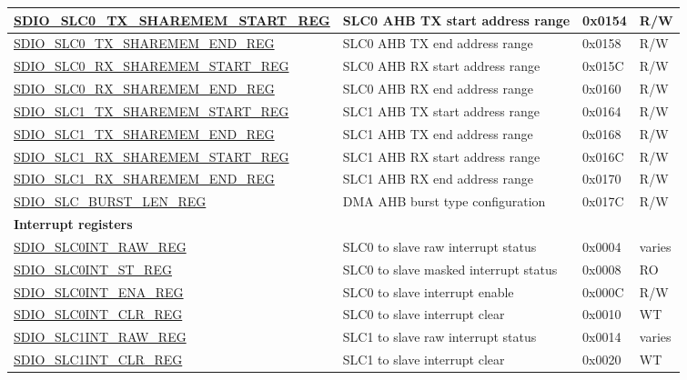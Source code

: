 \begin{longtable}{ | p{7.1cm} | p{6.1cm} | p{1.2cm} | p{1cm} | }
\hyperref[regdesc:SDIOSLC0TXSHAREMEMSTARTREG]{SDIO\_SLC0\_TX\_SHAREMEM\_START\_REG} & SLC0 AHB TX start address range & 0x0154 & R/W \\ \hline
\hyperref[regdesc:SDIOSLC0TXSHAREMEMENDREG]{SDIO\_SLC0\_TX\_SHAREMEM\_END\_REG} & SLC0 AHB TX end address range & 0x0158 & R/W \\ \hline
\hyperref[regdesc:SDIOSLC0RXSHAREMEMSTARTREG]{SDIO\_SLC0\_RX\_SHAREMEM\_START\_REG} & SLC0 AHB RX start address range & 0x015C & R/W \\ \hline
\hyperref[regdesc:SDIOSLC0RXSHAREMEMENDREG]{SDIO\_SLC0\_RX\_SHAREMEM\_END\_REG} & SLC0 AHB RX end address range & 0x0160 & R/W \\ \hline
\hyperref[regdesc:SDIOSLC1TXSHAREMEMSTARTREG]{SDIO\_SLC1\_TX\_SHAREMEM\_START\_REG} & SLC1 AHB TX start address range & 0x0164 & R/W \\ \hline
\hyperref[regdesc:SDIOSLC1TXSHAREMEMENDREG]{SDIO\_SLC1\_TX\_SHAREMEM\_END\_REG} & SLC1 AHB TX end address range & 0x0168 & R/W \\ \hline
\hyperref[regdesc:SDIOSLC1RXSHAREMEMSTARTREG]{SDIO\_SLC1\_RX\_SHAREMEM\_START\_REG} & SLC1 AHB RX start address range & 0x016C & R/W \\ \hline
\hyperref[regdesc:SDIOSLC1RXSHAREMEMENDREG]{SDIO\_SLC1\_RX\_SHAREMEM\_END\_REG} & SLC1 AHB RX end address range & 0x0170 & R/W \\ \hline
\hyperref[regdesc:SDIOSLCBURSTLENREG]{SDIO\_SLC\_BURST\_LEN\_REG} & DMA AHB burst type configuration & 0x017C & R/W \\ \hline
\multicolumn{4}{|l|}{\textbf{Interrupt registers}} \\ \hline
\hyperref[regdesc:SDIOSLC0INTRAWREG]{SDIO\_SLC0INT\_RAW\_REG} & SLC0 to slave raw interrupt status & 0x0004 & varies \\ \hline
\hyperref[regdesc:SDIOSLC0INTSTREG]{SDIO\_SLC0INT\_ST\_REG} & SLC0 to slave masked interrupt status & 0x0008 & RO \\ \hline
\hyperref[regdesc:SDIOSLC0INTENAREG]{SDIO\_SLC0INT\_ENA\_REG} & SLC0 to slave interrupt enable & 0x000C & R/W \\ \hline
\hyperref[regdesc:SDIOSLC0INTCLRREG]{SDIO\_SLC0INT\_CLR\_REG} & SLC0 to slave interrupt clear & 0x0010 & WT \\ \hline
\hyperref[regdesc:SDIOSLC1INTRAWREG]{SDIO\_SLC1INT\_RAW\_REG} & SLC1 to slave raw interrupt status & 0x0014 & varies \\ \hline
\hyperref[regdesc:SDIOSLC1INTCLRREG]{SDIO\_SLC1INT\_CLR\_REG} & SLC1 to slave interrupt clear & 0x0020 & WT \\ \hline

\end{longtable}
